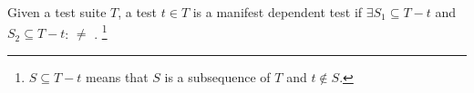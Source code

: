 


\begin{definition} \label{def:manifest}
Given a test suite\/ $T$, a test $t \in T$ is a
manifest dependent test if $\exists {S_1 \subseteq T - t}$
and ${S_2 \subseteq T - t}$:  $\neq$
.
\footnote{$S \subseteq T - t$ means that $S$ is a subsequence of $T$
and $t \notin S$.}
\end{definition}




